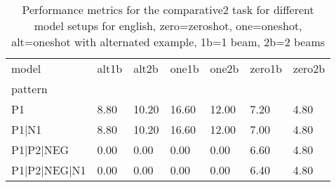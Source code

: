 \begin{table}[h]
\begin{tabular}{l|llllll}
\toprule
model & alt1b & alt2b & one1b & one2b & zero1b & zero2b \\
pattern &  &  &  &  &  &  \\
\midrule
P1 & 8.80 & 10.20 & 16.60 & 12.00 & 7.20 & 4.80 \\
P1|N1 & 8.80 & 10.20 & 16.60 & 12.00 & 7.00 & 4.80 \\
P1|P2|NEG & 0.00 & 0.00 & 0.00 & 0.00 & 6.60 & 4.80 \\
P1|P2|NEG|N1 & 0.00 & 0.00 & 0.00 & 0.00 & 6.40 & 4.80 \\
\bottomrule
\end{tabular}
\caption{Performance metrics for the comparative2 task for different model setups for english, zero=zeroshot, one=oneshot, alt=oneshot with alternated example, 1b=1 beam, 2b=2 beams}
\label{tab:en_comparative2_performance}
\end{table}
